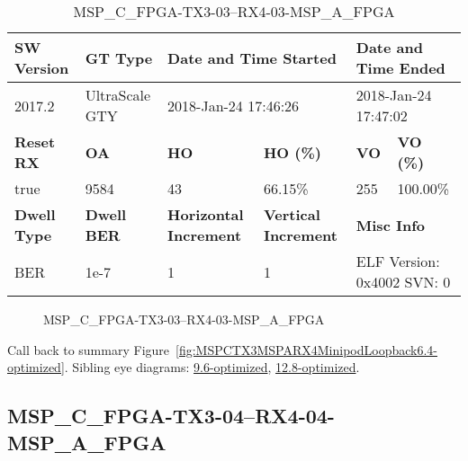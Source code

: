 \begin{table}[h]
\centering
\caption{MSP\_C\_FPGA-TX3-03--RX4-03-MSP\_A\_FPGA}
\label{tab:MSPCFPGATX303RX403MSPAFPGA6.4-optimized}
\begin{tabular}{@{}|l|l|l|l|l|l|@{}}
\toprule
\textbf{SW Version}                & \textbf{GT Type}   & \multicolumn{2}{l|}{\textbf{Date and Time Started}}            & \multicolumn{2}{l|}{\textbf{Date and Time Ended}}        \\ \midrule
2017.2                       & UltraScale GTY          & \multicolumn{2}{l|}{2018-Jan-24 17:46:26}                   & \multicolumn{2}{l|}{2018-Jan-24 17:47:02}               \\ \midrule
\textbf{Reset RX}                  & \textbf{OA} & \textbf{HO}   & \textbf{HO (\%)} & \textbf{VO} & \textbf{VO (\%)} \\ \midrule
true & 9584        & 43          & 66.15\%        & 255        & 100.00\%       \\ \midrule
\textbf{Dwell Type}                & \textbf{Dwell BER} & \textbf{Horizontal Increment} & \textbf{Vertical Increment}    & \multicolumn{2}{l|}{\textbf{Misc Info}}                  \\ \midrule
BER                            & 1e-7        & 1        & 1           & \multicolumn{2}{l|}{ELF Version: 0x4002 SVN: 0}                         \\ \bottomrule
\end{tabular}
\end{table}

\begin{figure}[h]
\caption{MSP\_C\_FPGA-TX3-03--RX4-03-MSP\_A\_FPGA} \label{fig:MSPCFPGATX303RX403MSPAFPGA6.4-optimized}
\end{figure}

Call back to summary Figure~\ref{fig:MSPCTX3MSPARX4MinipodLoopback6.4-optimized}.
Sibling eye diagrams: \hyperref[sec:MSPCFPGATX303RX403MSPAFPGA9.6-optimized]{9.6-optimized}, \hyperref[sec:MSPCFPGATX303RX403MSPAFPGA12.8-optimized]{12.8-optimized}.

\clearpage
\newpage


\subsection{MSP\_C\_FPGA-TX3-04--RX4-04-MSP\_A\_FPGA}\label{sec:MSPCFPGATX304RX404MSPAFPGA6.4-optimized}

